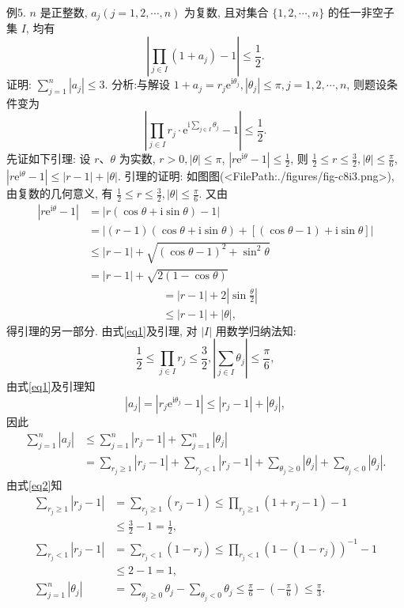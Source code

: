 例5. $n$ 是正整数, $a_j(j=1,2, \cdots, n)$ 为复数, 且对集合 $\{1,2, \cdots, n\}$ 的任一非空子集 $I$, 均有
$$
\left|\prod_{j \in I}\left(1+a_j\right)-1\right| \leqslant \frac{1}{2} . \label{eq1}
$$
证明: $\sum_{j=1}^n\left|a_j\right| \leqslant 3$.
分析:与解设 $1+a_j=r_j \mathrm{e}^{\mathrm{i} \theta_j},\left|\theta_j\right| \leqslant \pi, j=1,2, \cdots, n$, 则题设条件变为
$$
\left|\prod_{j \in I} r_j \cdot \mathrm{e}^{\mathrm{i} \sum_{j \in I} \theta_j}-1\right| \leqslant \frac{1}{2} .
$$
先证如下引理: 设 $r 、 \theta$ 为实数, $r>0,|\theta| \leqslant \pi$, $\left|r \mathrm{e}^{\mathrm{i} \theta}-1\right| \leqslant \frac{1}{2}$, 则 $\frac{1}{2} \leqslant r \leqslant \frac{3}{2},|\theta| \leqslant \frac{\pi}{6}$, $\left|r \mathrm{e}^{\mathrm{i} \theta}-1\right| \leqslant|r-1|+|\theta|$.
引理的证明: 如图图(<FilePath:./figures/fig-c8i3.png>), 由复数的几何意义, 有 $\frac{1}{2} \leqslant r \leqslant \frac{3}{2},|\theta| \leqslant \frac{\pi}{6}$.
又由
$$
\begin{aligned}
\left|r \mathrm{e}^{\mathrm{i} \theta}-1\right| & =|r(\cos \theta+\mathrm{i} \sin \theta)-1| \\
& =|(r-1)(\cos \theta+\mathrm{i} \sin \theta)+[(\cos \theta-1)+\mathrm{i} \sin \theta]| \\
& \leqslant|r-1|+\sqrt{(\cos \theta-1)^2+\sin ^2 \theta} \\
& =|r-1|+\sqrt{2(1-\cos \theta)}
\end{aligned}
$$
$$
\begin{aligned}
& =|r-1|+2\left|\sin \frac{\theta}{2}\right| \\
& \leqslant|r-1|+|\theta|,
\end{aligned}
$$
得引理的另一部分.
由式\ref{eq1}及引理, 对 $|I|$ 用数学归纳法知:
$$
\frac{1}{2} \leqslant \prod_{j \in I} r_j \leqslant \frac{3}{2},\left|\sum_{j \in I} \theta_j\right| \leqslant \frac{\pi}{6}, \label{eq2}
$$
由式\ref{eq1}及引理知
$$
\left|a_j\right|=\left|r_j \mathrm{e}^{\mathrm{i} \theta_j}-1\right| \leqslant\left|r_j-1\right|+\left|\theta_j\right|,
$$
因此
$$
\begin{aligned}
\sum_{j=1}^n\left|a_j\right| & \leqslant \sum_{j=1}^n\left|r_j-1\right|+\sum_{j=1}^n\left|\theta_j\right| \\
& =\sum_{r_j \geqslant 1}\left|r_j-1\right|+\sum_{r_j<1}\left|r_j-1\right|+\sum_{\theta_j \geqslant 0}\left|\theta_j\right|+\sum_{\theta_j<0}\left|\theta_j\right| .
\end{aligned}
$$
由式\ref{eq2}知
$$
\begin{aligned}
\sum_{r_j \geqslant 1}\left|r_j-1\right| & =\sum_{r_j \geqslant 1}\left(r_j-1\right) \leqslant \prod_{r_j \geqslant 1}\left(1+r_j-1\right)-1 \\
& \leqslant \frac{3}{2}-1=\frac{1}{2}, \\
\sum_{r_j<1}\left|r_j-1\right| & =\sum_{r_j<1}\left(1-r_j\right) \leqslant \prod_{r_j<1}\left(1-\left(1-r_j\right)\right)^{-1}-1 \\
& \leqslant 2-1=1, \\
\sum_{j=1}^n\left|\theta_j\right| & =\sum_{\theta_j \geqslant 0} \theta_j-\sum_{\theta_j<0} \theta_j \leqslant \frac{\pi}{6}-\left(-\frac{\pi}{6}\right) \leqslant \frac{\pi}{3} .
\end{aligned}
$$
